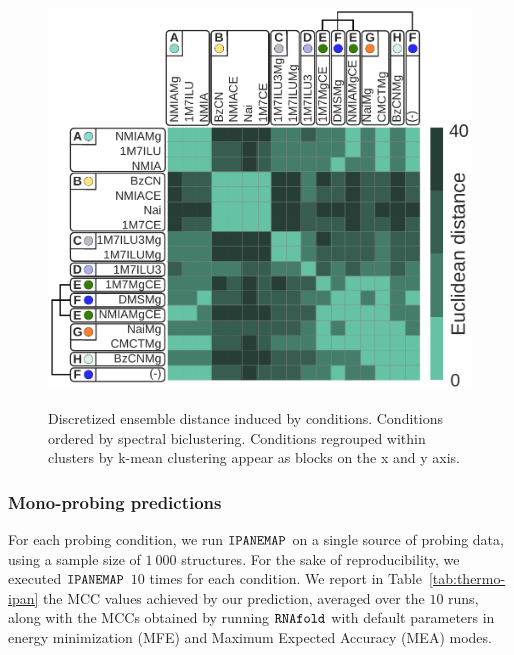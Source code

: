 \documentclass[a4,center,fleqn]{NAR}
\newcommand{\Software}[1]{$\text{\ttfamily #1}$}
\newcommand{\OurTool}{\Software{IPANEMAP}\xspace}
\newcommand{\Def}[1]{{\em #1}}
\begin{document}
\begin{figure}
	{\centering \includegraphics[width=\linewidth]{graphs/didy/bi_clustering}\\}%
	
	\caption{Discretized ensemble distance induced by conditions. Conditions ordered by spectral biclustering. Conditions regrouped within clusters by k-mean clustering appear as blocks on the x and y axis.}\label{fig:biclustering}
\end{figure}







\subsubsection{Mono-probing predictions}



For each probing condition, we run \OurTool{} on a single source of probing data, using a sample size of $1~000$ structures. For the sake of reproducibility, we executed \OurTool{} $10$ times for each condition. We report in Table~\ref{tab:thermo-ipan} the MCC values achieved by our prediction, averaged over the $10$ runs, along with the MCCs obtained by running \Software{RNAfold} with default parameters in energy minimization (MFE) and Maximum Expected Accuracy (MEA) modes.
\end{document}
